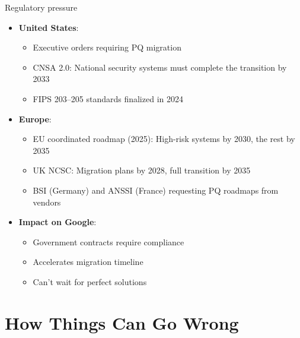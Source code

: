 \ifdefined\PRESENTATION\else\PassOptionsToClass{handout}{beamer}\fi\documentclass[aspectratio=169, lualatex]{beamer}
\begin{document}
\begin{frame}{Regulatory pressure}
	\begin{itemize}
		\item \textbf{United States}:
		      \begin{itemize}
			      \item Executive orders requiring PQ migration
			      \item CNSA 2.0: National security systems must complete the transition by 2033
			      \item FIPS 203--205 standards finalized in 2024
		      \end{itemize}
		\item \textbf{Europe}:
		      \begin{itemize}
			      \item EU coordinated roadmap (2025): High-risk systems by 2030, the rest by 2035
			      \item UK NCSC: Migration plans by 2028, full transition by 2035
			      \item BSI (Germany) and ANSSI (France) requesting PQ roadmaps from vendors
		      \end{itemize}
		\item \textbf{Impact on Google}:
		      \begin{itemize}
			      \item Government contracts require compliance
			      \item Accelerates migration timeline
			      \item Can't wait for perfect solutions
		      \end{itemize}
	\end{itemize}
\end{frame}

\section{How Things Can Go Wrong}
\end{document}
